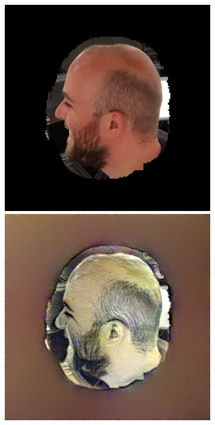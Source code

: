 \begin{figure}
\begin{subfigure}{0.22\linewidth}
	\end{subfigure}
    \begin{subfigure}{0.22\linewidth}
        \includegraphics[width=\textwidth]{Figures/failed/stross/textures/masked/masked_head_8-5-3-2_123851_842.png}
        \includegraphics[width=\textwidth]{Figures/failed/stross/textures/16/stylized_view_8-5-3-2_123851_842.png}

\end{subfigure}
\end{figure}
